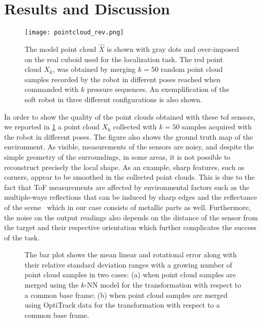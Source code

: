 \section{Results and Discussion}\label{sec:results}

\begin{figure}[b!]
	\centering
	\texttt{[image: pointcloud\_rev.png]}
	\caption{The model point cloud $\hat{X}$ is shown with gray dots and over-imposed on the real cuboid used for the localization task. The red point cloud $X_k$, was obtained by merging $k=50$ random point cloud samples recorded by the robot in different poses reached when commanded with $k$ pressure sequences. An exemplification of the soft robot in three different configurations is also shown. }
	\label{fig:reco}
\end{figure}

In order to show the quality of the point clouds obtained with these \gls{tof} sensors, we reported in \cref{fig:reco} a point cloud $X_k$ collected with $k = 50$ samples acquired with the robot in different poses. The figure also shows the ground truth map of the environment. As visible, measurements of the sensors are noisy, and despite the simple geometry of the surroundings, in some areas, it is not possible to reconstruct precisely the local shape. As an example, sharp features, such as corners, appear to be smoothed in the collected point clouds. This is due to the fact that ToF measurements are affected by environmental factors such as the multiple-ways reflections that can be induced by sharp edges and the reflectance of the scene~\cite{gudmundsson2007environmental, may2009robust} which in our case consists of metallic parts as well. Furthermore, the noise on the output readings also depends on the distance of the sensor from the target and their respective orientation which further complicates the success of the task.
% 

\begin{figure}[t]
	\centering
	\caption{The bar plot shows the mean linear and rotational error along with their relative standard deviation ranges with a growing number of point cloud samples in two cases: (a) when point cloud samples are merged using the $k$-NN model for the transformation with respect to a common base frame; (b) when point cloud samples are merged using OptiTrack data for the transformation with respect to a common base frame. }
	\label{fig:results}
\end{figure}  
%

